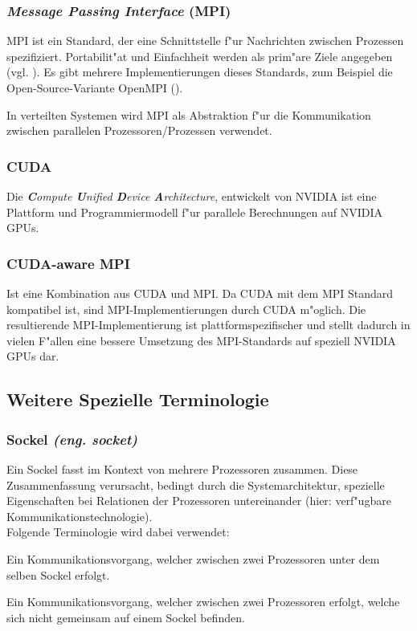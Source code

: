 \subsubsection{ \textit{Message Passing Interface} (MPI) }
MPI ist ein Standard, der eine Schnittstelle f"ur Nachrichten zwischen Prozessen spezifiziert. Portabilit"at und Einfachheit werden als prim"are Ziele angegeben (vgl. \cite[Kap. 1.1]{mpi}). Es gibt mehrere Implementierungen dieses Standards, zum Beispiel die Open-Source-Variante OpenMPI (\cite{openmpi}).

In verteilten Systemen wird MPI als Abstraktion f"ur die Kommunikation zwischen parallelen Prozessoren/Prozessen verwendet.

\subsubsection{ CUDA }
Die \textit{\textbf{C}ompute \textbf{U}nified \textbf{D}evice \textbf{A}rchitecture}, entwickelt von NVIDIA ist eine Plattform und Programmiermodell f"ur parallele Berechnungen auf NVIDIA GPUs. 

\subsubsection{ CUDA-aware MPI }
Ist eine Kombination aus CUDA und MPI. Da CUDA mit dem MPI Standard kompatibel ist, sind MPI-Implementierungen durch CUDA m"oglich. Die resultierende MPI-Implementierung ist plattformspezifischer und stellt dadurch in vielen F"allen eine bessere Umsetzung des MPI-Standards auf speziell NVIDIA GPUs dar.

\subsection{Weitere Spezielle Terminologie}
\subsubsection{Sockel \textit{(eng. socket)}}
Ein Sockel fasst im Kontext von \cite{mainpaper} mehrere Prozessoren zusammen. Diese Zusammenfassung verursacht, bedingt durch die Systemarchitektur, spezielle Eigenschaften bei Relationen der Prozessoren untereinander (hier: verf"ugbare Kommunikationstechnologie).\\
Folgende Terminologie wird dabei verwendet:
\begin{defi}
Ein Kommunikationsvorgang, welcher zwischen zwei Prozessoren unter dem selben Sockel erfolgt.
\end{defi}
\begin{defi}
Ein Kommunikationsvorgang, welcher zwischen zwei Prozessoren erfolgt, welche sich nicht gemeinsam auf einem Sockel befinden.
\end{defi}

